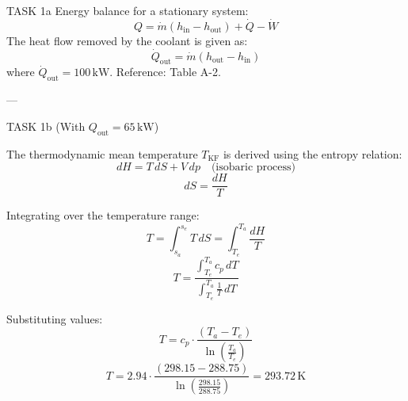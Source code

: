 TASK 1a  
Energy balance for a stationary system:  
\[
Q = \dot{m} (h_{\text{in}} - h_{\text{out}}) + \dot{Q} - \dot{W}
\]  
The heat flow removed by the coolant is given as:  
\[
\dot{Q}_{\text{out}} = \dot{m} (h_{\text{out}} - h_{\text{in}})
\]  
where \( \dot{Q}_{\text{out}} = 100 \, \text{kW} \).  
Reference: Table A-2.

---

TASK 1b  
(With \( Q_{\text{out}} = 65 \, \text{kW} \))  

The thermodynamic mean temperature \( T_{\text{KF}} \) is derived using the entropy relation:  
\[
dH = T \, dS + V \, dp \quad \text{(isobaric process)}
\]  
\[
dS = \frac{dH}{T}
\]  

Integrating over the temperature range:  
\[
T = \int_{s_a}^{s_e} T \, dS = \int_{T_e}^{T_a} \frac{dH}{T}
\]  
\[
T = \frac{\int_{T_e}^{T_a} c_p \, dT}{\int_{T_e}^{T_a} \frac{1}{T} \, dT}
\]  

Substituting values:  
\[
T = c_p \cdot \frac{(T_a - T_e)}{\ln \left( \frac{T_a}{T_e} \right)}
\]  
\[
T = 2.94 \cdot \frac{(298.15 - 288.75)}{\ln \left( \frac{298.15}{288.75} \right)} = 293.72 \, \text{K}
\]